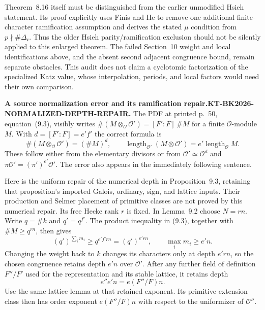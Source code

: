 \documentclass[11pt,a4paper]{article}
\theoremstyle{definition}
\renewcommand{\paragraph}[1]{\par\smallskip\noindent\textbf{#1}\quad\ignorespaces}
\begin{document}
Theorem~8.16 itself must be distinguished from the earlier unmodified
Hsieh statement.  Its proof explicitly uses Finis and He to remove
one additional finite-character ramification assumption and derives
the stated $\mu$ condition from $p\nmid\#\Delta_{\mathfrak c}$.
Thus the older Hsieh parity/ramification exclusion should not be
silently applied to this enlarged theorem.  The failed Section~10
weight and local identifications above, and the absent second
adjacent congruence bound, remain separate obstacles.  This audit
does not claim a cyclotomic factorization of the specialized Katz
value, whose interpolation, periods, and local factors would need
their own comparison.

\paragraph{A source normalization error and its ramification repair.}\textbf{KT-BK2026-NORMALIZED-DEPTH-REPAIR.} 
The PDF at printed p.~50, equation~(9.3), visibly writes
$\#(M\otimes_{\mathcal O}\mathcal O')=[F':F]\,\#M$ for a
finite $\mathcal O$-module $M$.  With $d=[F':F]=e'f'$ the correct
formula is
\[
 \#(M\otimes_{\mathcal O}\mathcal O')=(\#M)^d,\qquad
 \operatorname{length}_{\mathcal O'}(M\otimes\mathcal O')
       =e'\operatorname{length}_{\mathcal O}M.                \tag{AF.10}
\]
These follow either from the elementary divisors or from
$\mathcal O'\simeq\mathcal O^d$ and
$\pi\mathcal O'=(\pi')^{e'}\mathcal O'$.
The error also appears in the immediately following sentence.

Here is the uniform repair of the numerical depth in Proposition~9.3,
retaining that proposition's imported Galois, ordinary, sign, and
lattice inputs.  Their production and Selmer placement of primitive
classes are not proved by this numerical repair.  Its free Hecke
rank $r$ is fixed.  In Lemma~9.2 choose
$N=rn$.  Write $q=\#k$ and $q'=q^{f'}$.  The product inequality
in (9.3), together with $\#M\geq q^{rn}$, then gives
\[
 (q')^{\sum_i m_i}\geq q^{e'f'rn}
       =(q')^{e'rn},\qquad \max_i m_i\geq e'n.               \tag{AF.11}
\]
Changing the weight back to $k$ changes its characters only at depth
$e'rn$, so the chosen congruence retains depth $e'n$ over
$\mathcal O'$.  After any further field of definition $F''/F'$
used for the representation and its stable lattice, it retains depth
\[
 e''e'n=e(F''/F)n.                                          \tag{AF.12}
\]
Use the same lattice lemma at that retained exponent.  Its primitive
extension class then has order exponent $e(F''/F)n$ with respect to
the uniformizer of $\mathcal O''$.
\end{document}
